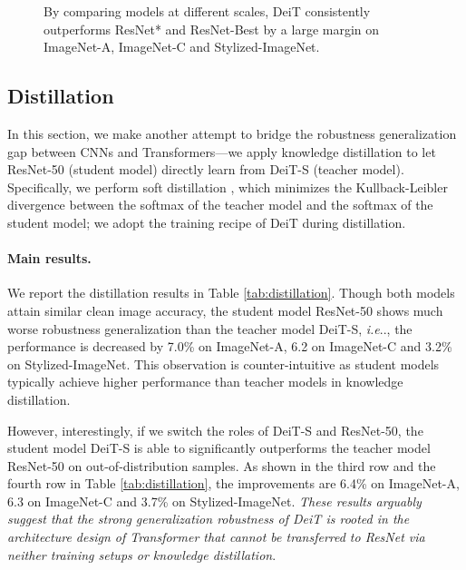 \documentclass{article}
\makeatletter
\DeclareRobustCommand\onedot{\futurelet\@let@token\@onedot}
\def\@onedot{\ifx\@let@token.\else.\null\fi\xspace}
\def\ie{\emph{i.e}\onedot} \def\Ie{\emph{I.e}\onedot}
\makeatother
\begin{document}
\begin{figure}[!ht]
\centering
\vspace{-0.3em}
    \vspace{-0.3em}
    \caption{By comparing models at different scales, DeiT consistently outperforms ResNet* and ResNet-Best by a large margin on ImageNet-A, ImageNet-C and Stylized-ImageNet.}
    \label{fig:trend}
\end{figure}



\subsection{Distillation} 
\label{sec:distill}
In this section, we make another attempt to bridge the robustness generalization gap between CNNs and Transformers---we apply knowledge distillation to let ResNet-50 (student model) directly learn from DeiT-S (teacher model). Specifically, we perform soft distillation \cite{hinton2015distilling}, which minimizes the Kullback-Leibler divergence between the softmax of the teacher model and the softmax of the student model; we adopt the training recipe of DeiT during distillation.

\paragraph{Main results.} 
We report the distillation results in Table \ref{tab:distillation}. Though both models attain similar clean image accuracy, the student model ResNet-50 shows much worse robustness generalization than the teacher model DeiT-S, \ie, the performance is decreased by 7.0\% on ImageNet-A, 6.2 on ImageNet-C and 3.2\% on Stylized-ImageNet. This observation is counter-intuitive  as student models typically achieve higher performance than teacher models in  knowledge distillation.

However, interestingly, if we switch the roles of DeiT-S and ResNet-50, the student model DeiT-S is able to significantly outperforms the teacher model ResNet-50 on out-of-distribution samples. As shown in the third row and the fourth row in  Table \ref{tab:distillation}, the improvements are 6.4\% on ImageNet-A, 6.3 on ImageNet-C and 3.7\% on Stylized-ImageNet. \emph{These results arguably suggest that the strong generalization robustness of DeiT is rooted in the architecture design of Transformer that cannot be transferred to ResNet via neither training setups or knowledge distillation}.
\end{document}
